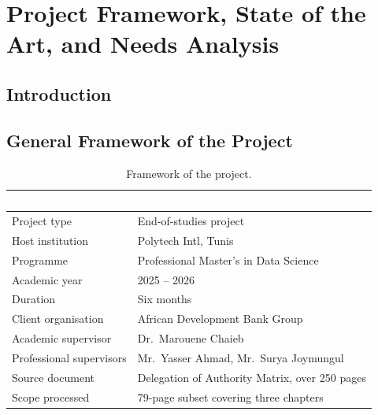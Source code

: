 
\chapter{Project Framework, State of the Art, and Needs Analysis}
\minitoc

\section*{Introduction}



\section{General Framework of the Project}


\begin{table}[h]
\centering
\caption{Framework of the project.}
\label{tab:framework}
\begin{tabular}{|p{}|p{}|}
\hline
\rowcolor{myblue}\textcolor{white}{\textbf{Item}} & \textcolor{white}{\textbf{Detail}} \\
\hline
Project type & End-of-studies project \\ \hline
Host institution & Polytech Intl, Tunis \\ \hline
Programme & Professional Master's in Data Science \\ \hline
Academic year & 2025 -- 2026 \\ \hline
Duration & Six months \\ \hline
Client organisation & African Development Bank Group \\ \hline
Academic supervisor & Dr.~Marouene Chaieb \\ \hline
Professional supervisors & Mr.~Yasser Ahmad, Mr.~Surya Joymungul \\ \hline
Source document & Delegation of Authority Matrix, over 250 pages \\ \hline
Scope processed & 79-page subset covering three chapters \\ \hline
\end{tabular}
\end{table}

